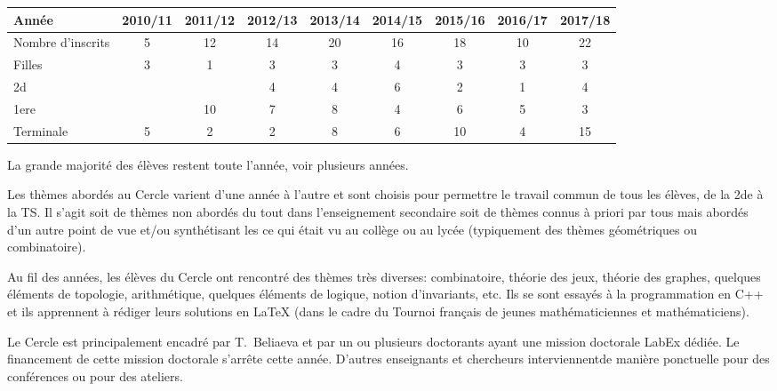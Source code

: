 \documentclass[11pt,notitlepage]{article}
\begin{document}
\medskip

\begin{tabular}{|l|c|c|c|c|c|c|c|c|}
	\hline
	Ann\'ee & 2010/11&2011/12&2012/13&2013/14&2014/15&2015/16& 2016/17&2017/18\\
	\hline
	Nombre d'inscrits&5 &12 &14 & 20&16 & 18&10 &22 \\
	\hline
	Filles& 3&1 &3 &3&4 &3 & 3&3 \\
	\hline
	2d& & &4 &4 &6 &2 &1 & 4\\
	\hline
	1ere& & 10&7 & 8&4 &6 &5 &3 \\
	\hline
	Terminale&5 &2 &2 &8 &6 &10 &4 &15 \\
	\hline
\end{tabular}

\medskip

La grande majorit\'e des \'el\`eves restent toute l'ann\'ee, voir plusieurs ann\'ees.

 Les th\`emes abord\'es au Cercle varient d'une ann\'ee \`a l'autre et
sont choisis pour permettre
le travail commun de tous les \'el\`eves, de la 2de \`a la TS. Il s'agit soit de th\`emes non abord\'es du tout dans l'enseignement secondaire soit de th\`emes connus \`a priori par tous mais abord\'es d'un autre point de vue et/ou synth\'etisant les ce qui \'etait vu au coll\`ege ou au lyc\'ee (typiquement des th\`emes g\'eom\'etriques ou combinatoire).

Au fil des ann\'ees, les \'el\`eves du Cercle ont rencontr\'e  des th\`emes tr\`es diverses: combinatoire, th\'eorie des jeux, th\'eorie des graphes, quelques \'el\'ements de topologie, arithm\'etique, quelques \'el\'ements de logique, notion d'invariants, etc. Ils se sont essay\'es \`a la programmation en C++ et ils apprennent \`a r\'ediger  leurs solutions en LaTeX (dans le cadre du Tournoi fran\c cais de jeunes math\'ematiciennes et math\'ematiciens).

Le Cercle est principalement encadr\'e par T.~Beliaeva et par un ou plusieurs doctorants ayant une mission doctorale LabEx d\'edi\'ee. Le financement de cette mission doctorale s'arr\^ete cette ann\'ee. D'autres enseignants et chercheurs interviennentde mani\`ere ponctuelle pour des conf\'erences ou pour des ateliers.
\end{document}

